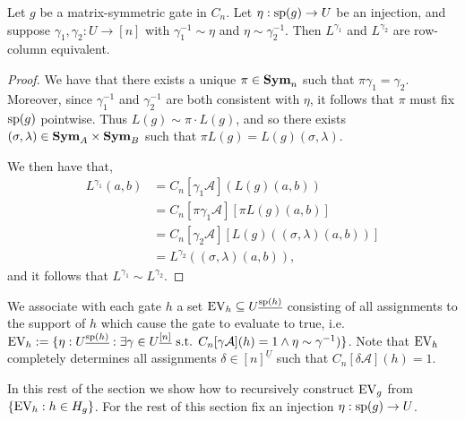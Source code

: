 \documentclass[../paper.tex]{subfiles}
\begin{document}
\begin{lem}
  Let $g$ be a matrix-symmetric gate in $C_n$. Let $\eta: \text{sp}(g) \rightarrow
  U$ be an injection, and suppose $\gamma_1, \gamma_2: U \rightarrow [n]$ with
  $\gamma^{-1}_1 \sim \eta$ and $\eta \sim \gamma^{-1}_2$. Then $L^{\gamma_1}$
  and $L^{\gamma_2}$ are row-column equivalent.
\end{lem}

\begin{proof}
  We have that there exists a unique $\pi \in \text{\textbf{Sym}}_n$ such that $\pi \gamma_1 =
  \gamma_2$. Moreover, since $\gamma^{-1}_1$ and $\gamma^{-1}_2$ are both
  consistent with $\eta$, it follows that $\pi$ must fix $\text{sp}(g)$ pointwise.
  Thus $L(g) \sim \pi \cdot L(g)$, and so there exists $(\sigma, \lambda) \in
  \text{\textbf{Sym}}_A \times \text{\textbf{Sym}}_B$ such that $\pi L(g) = L(g) (\sigma, \lambda)$.

  We then have that,
  \begin{align*}
    L^{\gamma_1} (a,b) &= C_n[\gamma_1 \mathcal{A}](L(g)(a,b))\\
                       & = C_n[\pi \gamma_1 \mathcal{A}][\pi L(g)(a,b)] \\
                       & = C_n[\gamma_2 \mathcal{A}][L(g)((\sigma, \lambda)(a,b))]\\
                       & = L^{\gamma_2} ((\sigma, \lambda) (a,b)),
  \end{align*}
  and it follows that $L^{\gamma_1} \sim L^{\gamma_2}$.
\end{proof}

We associate with each gate $h$ a set $\text{EV}_h \subseteq
U^{\underline{\text{sp}(h)}}$ consisting of all assignments to the support of $h$
which cause the gate to evaluate to true, i.e. $\text{EV}_h := \{ \eta:
U^{\underline{\text{sp}(h)}} : \exists \gamma \in U^{\underline{[n]}} \text{ s.t.
}C_n [\gamma \mathcal{A}](h) = 1 \wedge \eta \sim \gamma^{-1})\}$. Note that
$\text{EV}_h$ completely determines all assignments $\delta \in [n]^{\underline{U}}$
such that $C_n[\delta \mathcal{A}](h) = 1$.

In this rest of the section we show how to recursively construct $\text{EV}_g$ from
$\{\text{EV}_h : h \in H_g\}$. For the rest of this section fix an injection $\eta :
\text{sp}(g) \rightarrow U$.
\end{document}
